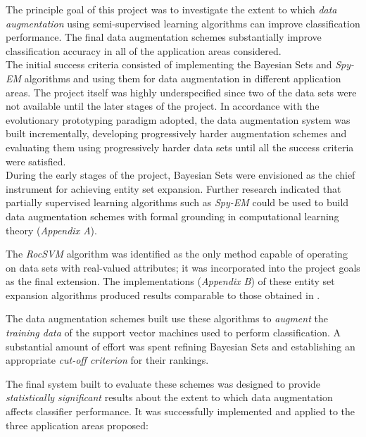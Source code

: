 \documentclass[12pt,twoside,notitlepage,amsart]{report} %
\begin{document}
The principle goal of this project was to investigate the extent to which \emph{data augmentation} using semi-supervised learning algorithms can improve classification performance. The final data augmentation schemes substantially improve classification accuracy in all of the application areas considered. \\
	
The initial success criteria consisted of implementing the Bayesian Sets and \emph{Spy-EM} algorithms and using them for data augmentation in different application areas. The project itself was highly underspecified since two of the data sets were not available until the later stages of the project. In accordance with the evolutionary prototyping paradigm adopted, the data augmentation system was built incrementally, developing progressively harder augmentation schemes and evaluating them using progressively harder data sets until all the success criteria were satisfied. \\
	
During the early stages of the project, Bayesian Sets were envisioned as the chief instrument for achieving entity set expansion. Further research indicated that partially supervised learning algorithms such as \emph{Spy-EM} could be used to build data augmentation schemes with formal grounding in computational learning theory (\emph{Appendix A}).

The \emph{RocSVM} algorithm was identified as the only method capable of operating on data sets with real-valued attributes; it was incorporated into the project goals as the final extension. The implementations (\emph{Appendix B}) of these entity set expansion algorithms produced results comparable to those obtained in \cite{Ghahramani06, Li03, Li10}.
\clearpage
	
The data augmentation schemes built use these algorithms to \emph{augment} the \emph{training data} of the support vector machines used to perform classification. A substantial amount of effort was spent refining Bayesian Sets and establishing an appropriate \emph{cut-off criterion} for their rankings. 

The final system built to evaluate these schemes was designed to provide \emph{statistically significant} results about the extent to which data augmentation affects classifier performance. It was successfully implemented and applied to the three application areas proposed: 
	
\end{document}
